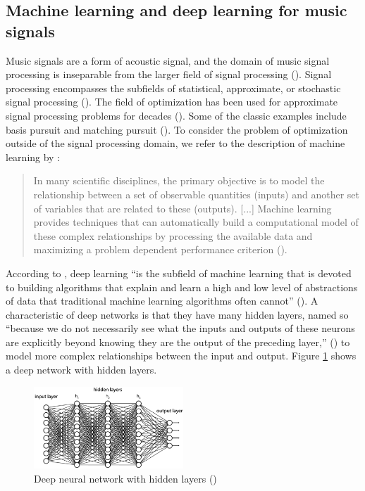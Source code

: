 \documentclass[report.tex]{subfiles}
\begin{document}
\newpagefill

\subsection{Machine learning and deep learning for music signals}
\label{sec:ml}

Music signals are a form of acoustic signal, and the domain of music signal processing is inseparable from the larger field of signal processing (\cite{musicsp}). Signal processing encompasses the subfields of statistical, approximate, or stochastic signal processing (\cite{stochasticsp, statisticalsp}). The field of optimization has been used for approximate signal processing problems for decades (\cite{optsp}). Some of the classic examples include basis pursuit and matching pursuit (\cite{dictionary1, dictionary2}). To consider the problem of optimization outside of the signal processing domain, we refer to the description of machine learning by \citeauthor{introtoml}:

\begin{quote}
	In many scientific disciplines, the primary objective is to model the relationship between a set of observable quantities (inputs) and another set of variables that are related to these (outputs). [...] Machine learning provides techniques that can automatically build a computational model of these complex relationships by processing the available data and maximizing a problem dependent performance criterion (\cite[105]{introtoml}).
\end{quote}

According to \citeauthor{introtodl}, deep learning ``is the subfield of machine learning that is devoted to building algorithms that explain and learn a high and low level of abstractions of data that traditional machine learning algorithms often cannot'' (\cite[1]{introtodl}). A characteristic of deep networks is that they have many hidden layers, named so ``because we do not necessarily see what the inputs and outputs of these neurons are explicitly beyond knowing they are the output of the preceding layer,'' (\cite[2]{introtodl}) to model more complex relationships between the input and output. Figure \ref{fig:fcdn} shows a deep network with hidden layers.

\begin{figure}[ht]
	\centering
	\includegraphics[width=0.5\textwidth]{./images-neural/dnn.png}
	\caption{Deep neural network with hidden layers (\cite[2]{introtodl})}
	\label{fig:fcdn}
\end{figure}
\end{document}

